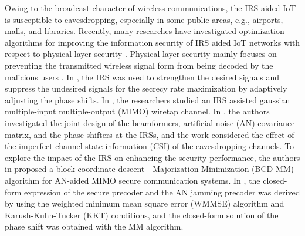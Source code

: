 \documentclass[10pt,journal,letterpaper,twocolumn,twoside]{IEEEtran} %
\begin{document}
Owing to  the broadcast character of wireless communications, the IRS aided IoT is
    susceptible to
eavesdropping, especially  in
some public areas, e.g., airports, malls, and libraries.
Recently, many researches have investigated
optimization algorithms for improving the information security of  IRS aided IoT networks with respect to
  physical layer security \cite{Cui19Secure,Dong20Secure,XYu20Robust,Hong20Artificial,ZChu21Secrecy}.
   Physical layer security mainly focuses on preventing the transmitted wireless signal form from being decoded by the malicious users \cite{Barros11Physical}.
In  \cite{Cui19Secure}, the IRS was used to strengthen the desired signals and suppress the undesired signals for the secrecy rate maximization by  adaptively adjusting the phase shifts. In \cite{Dong20Secure}, the researchers studied an IRS assisted gaussian multiple-input multiple-output (MIMO) wiretap channel.
 In  \cite{XYu20Robust}, the authors investigated the joint design of the beamformers, artificial noise (AN) covariance matrix,  and the phase shifters at the IRSs, and the work considered the effect of the imperfect channel state information (CSI) of the eavesdropping channels.
  To explore the impact of the IRS on enhancing the security performance, the authors in \cite{Hong20Artificial}  proposed a block coordinate descent - Majorization Minimization (BCD-MM) algorithm for   AN-aided MIMO secure communication systems.
 In \cite{ZChu21Secrecy}, the closed-form expression of the secure precoder and the AN jamming precoder was derived by using the weighted
minimum mean square error (WMMSE) algorithm and Karush-Kuhn-Tucker (KKT) conditions, and the closed-form solution of the phase shift was obtained with the MM algorithm.
\end{document}
